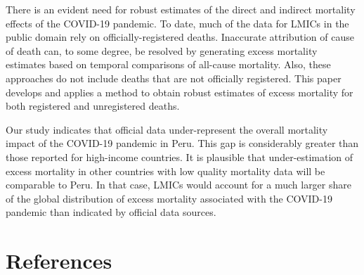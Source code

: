 \documentclass[
]{article}
\begin{document}
There is an evident need for robust estimates of the direct and indirect mortality effects of the COVID-19 pandemic. To date, much of the data for LMICs in the public domain rely on officially-registered deaths. Inaccurate attribution of cause of death can, to some degree, be resolved by generating excess mortality estimates based on temporal comparisons of all-cause mortality. Also, these approaches do not include deaths that are not officially registered. This paper develops and applies a method to obtain robust estimates of excess mortality for both registered and unregistered deaths.

Our study indicates that official data under-represent the overall mortality impact of the COVID-19 pandemic in Peru. This gap is considerably greater than those reported for high-income countries. It is plausible that under-estimation of excess mortality in other countries with low quality mortality data will be comparable to Peru. In that case, LMICs would account for a much larger share of the global distribution of excess mortality associated with the COVID-19 pandemic than indicated by official data sources.

\hypertarget{references}{%
\section{References}\label{references}}
\end{document}
